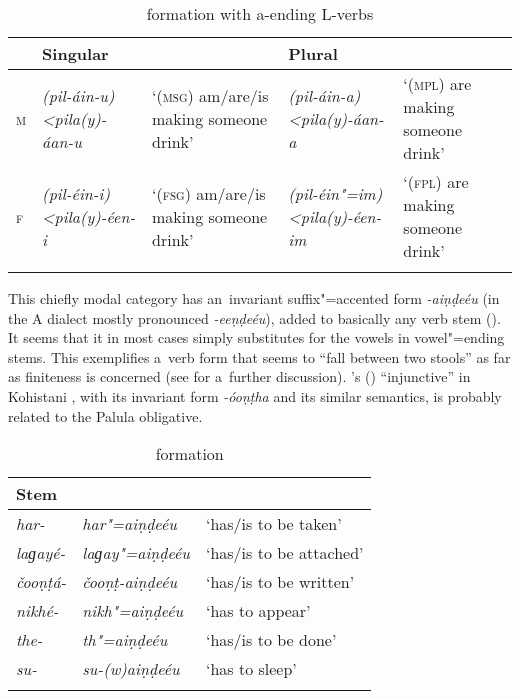 \begin{table}[t]
\caption{ formation with a-ending L-verbs}
\begin{tabularx}{\textwidth}{ l P{25mm} Q P{25mm} Q }
\lsptoprule
&
Singular &
&
Plural &
\\\midrule
\textsc{m}
&
\textit{(pil-áin-u)}
\textit{{\textless}pila(y)-áan-u} &
`(\textsc{msg}) am/are/is making someone drink' &
\textit{(pil-áin-a)}
\textit{{\textless}pila(y)-áan-a} &
`(\textsc{mpl}) are making someone drink'\\
\textsc{f}
&
\textit{(pil-éin-i)}
\textit{{\textless}pila(y)-éen-i} &
`(\textsc{fsg}) am/are/is making someone drink' &
\textit{(pil-éin"=im)}
\textit{{\textless}pila(y)-éen-im} &
`(\textsc{fpl}) are making someone drink'\\\lspbottomrule
\end{tabularx}
\label{tab:8-25}
\end{table}


 This chiefly modal category has an~invariant suffix"=accented form
\textit{-aiṇḍeéu} (in the A dialect mostly pronounced \textit{-eeṇḍeéu}\textsf{)}, added to
basically any verb stem (). It seems that it in most cases simply substitutes for the vowels in vowel"=ending stems. This exemplifies a~verb form that seems to ``fall between two stools'' as far as finiteness is concerned (see  for a~further discussion). \citeauthor{schmidt2003}'s (\citeyear[139]{schmidt2003}) ``injunctive'' in Kohistani \iliShina, with its invariant form \textit{-óoṇṭha} and its similar semantics, is probably related to the Palula obligative.


\begin{table}[t]
\caption{ formation}

\begin{tabularx}{.75\textwidth}{ l@{\hspace{20pt}} Q l@{\hspace{20pt}} }
\lsptoprule
Stem &
 &
\\\midrule
\textit{har-} &
\textit{har"=aiṇḍeéu} &
`has/is to be taken'\\
\textit{laɡayé-} &
\textit{laɡay"=aiṇḍeéu} &
`has/is to be attached'\\
\textit{čooṇṭá-} &
\textit{čooṇṭ-aiṇḍeéu} &
`has/is to be written'\\
\textit{nikhé-} &
\textit{nikh"=aiṇḍeéu} &
`has to appear'\\
\textit{the-} &
\textit{th"=aiṇḍeéu} &
`has/is to be done'\\
\textit{su-} &
\textit{su-(w)aiṇḍeéu} &
`has to sleep'\\\lspbottomrule
\end{tabularx}
\label{tab:8-27}
\end{table}




